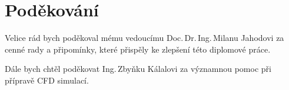 \null{}
\vfill
\section*{Poděkování}
Velice rád bych poděkoval mému vedoucímu Doc.\,Dr.\,Ing.\,Milanu Jahodovi za cenné rady a připomínky, které přispěly ke zlepšení této diplomové práce.

Dále bych chtěl poděkovat Ing.\,Zbyňku Kálalovi za významnou pomoc při přípravě CFD simulací.
\vspace{25mm}
